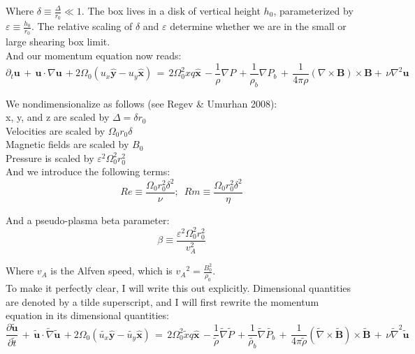 \documentclass[letterpaper,12pt]{article}
\newcommand\reye{\mathrel{Re}}
\newcommand\reym{\mathrel{Rm}}
\begin{document}
Where $\delta \equiv \frac{\Delta}{r_0} \ll 1 $. The box lives in a disk of vertical height $h_0$, parameterized by $\varepsilon \equiv \frac{h_0}{r_0}$. The relative scaling of $\delta$ and $\varepsilon$ determine whether we are in the small or large shearing box limit.\\

And our momentum equation now reads: 
\[\partial_t \mathbf{u} \, + \, \mathbf{u} \cdot \nabla \mathbf{u} \, + 2\Omega_0\left(u_x \mathbf{\hat{y}} - u_{y}\mathbf{\hat{x}}\right) \, = \, 2\Omega_0^2 x q \mathbf{\hat{x}} \, -\frac{1}{\rho}\nabla P \, +\frac{1}{\rho_b}\nabla P_b \,  + \, \frac{1}{4 \pi \rho} \left( \nabla \times \mathbf{B} \right) \times \mathbf{B} + \, \nu\nabla^2 \mathbf{u} \,\]

\noindent We nondimensionalize as follows (see Regev \& Umurhan 2008): \\

\noindent x, y, and z are scaled by $\Delta = \delta r_0$ \\
Velocities are scaled by $\Omega_0 r_0 \delta$ \\
Magnetic fields are scaled by $B_0$ \\
Pressure is scaled by $\varepsilon^2 \Omega_0^2 r_0^2$ \\ 

And we introduce the following terms:
\[\reye \equiv \frac{\Omega_0 r_0^2 \delta^2}{\nu} ; \, \, \, \reym \equiv \frac{\Omega_0 r_0^2 \delta^2}{\eta}\]

And a pseudo-plasma beta parameter: 
\[\beta \equiv \frac{\varepsilon^2\Omega_0^2r_0^2}{v_A^2} \]

Where $v_A$ is the Alfven speed, which is ${v_A}^2 = \frac{B_0^2}{\rho_0}$. \\

To make it perfectly clear, I will write this out explicitly. Dimensional quantities are denoted by a tilde superscript, and I will first rewrite the momentum equation in its dimensional quantities: \\

\[\frac{\partial \mathbf{\widetilde{u}}}{\partial \widetilde{t}} \, + \, \mathbf{\widetilde{u}} \cdot \widetilde{\nabla} \mathbf{\widetilde{u}} \, + 2\Omega_0\left(\widetilde{u_x} \mathbf{\hat{y}} - \widetilde{u_{y}}\mathbf{\hat{x}}\right) \, = \, 2\Omega_0^2 \widetilde{x} q \mathbf{\hat{x}} \, -\frac{1}{\widetilde{\rho}}\widetilde{\nabla} \widetilde{P} \, +\frac{1}{\widetilde{\rho_b}}\widetilde{\nabla} \widetilde{P_b} \,  + \, \frac{1}{4 \pi \widetilde{\rho}} \left( \widetilde{\nabla} \times \mathbf{\widetilde{B}} \right) \times \mathbf{\widetilde{B}}  \, + \, \nu \widetilde{\nabla}^2 \mathbf{\widetilde{u}} \,\]
\end{document}
